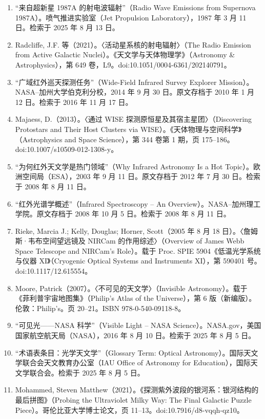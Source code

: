\begin{enumerate}
  \item “来自超新星 1987A 的射电波辐射”（Radio Wave Emissions from Supernova 1987A）。喷气推进实验室（Jet Propulsion Laboratory），1987 年 3 月 11 日。检索于 2025 年 8 月 13 日。
  \item Radcliffe, J.F. 等（2021）。〈活动星系核的射电辐射〉（The Radio Emission from Active Galactic Nuclei）。《天文学与天体物理学》（Astronomy \& Astrophysics），第 649 卷，L9。doi:10.1051/0004-6361/202140791。
  \item “广域红外巡天探测任务”（Wide-Field Infrared Survey Explorer Mission）。NASA–加州大学伯克利分校，2014 年 9 月 30 日。原文存档于 2010 年 1 月 12 日。检索于 2016 年 11 月 17 日。
  \item Majaess, D.（2013）。〈通过 WISE 探测原恒星及其宿主星团〉（Discovering Protostars and Their Host Clusters via WISE）。《天体物理与空间科学》（Astrophysics and Space Science），第 344 卷第 1 期，页 175–186。doi:10.1007/s10509-012-1308-y。
  \item “为何红外天文学是热门领域”（Why Infrared Astronomy Is a Hot Topic）。欧洲空间局（ESA），2003 年 9 月 11 日。原文存档于 2012 年 7 月 30 日。检索于 2008 年 8 月 11 日。
  \item “红外光谱学概述”（Infrared Spectroscopy – An Overview）。NASA–加州理工学院。原文存档于 2008 年 10 月 5 日。检索于 2008 年 8 月 11 日。
  \item Rieke, Marcia J.; Kelly, Douglas; Horner, Scott（2005 年 8 月 18 日）。〈詹姆斯·韦布空间望远镜及 NIRCam 的作用综述〉（Overview of James Webb Space Telescope and NIRCam’s Role）。载于 Proc. SPIE 5904《低温光学系统与仪器 XI》（Cryogenic Optical Systems and Instruments XI），第 590401 号。doi:10.1117/12.615554。
  \item Moore, Patrick（2007）。〈不可见的天文学〉（Invisible Astronomy）。载于《菲利普宇宙地图集》（Philip’s Atlas of the Universe），第 6 版（新编版）。伦敦：Philip’s。页 20–21。ISBN 978-0-540-09118-8。
  \item “可见光——NASA 科学”（Visible Light – NASA Science）。NASA.gov，美国国家航空航天局（NASA），2016 年 8 月 10 日。检索于 2025 年 8 月 5 日。
  \item “术语表条目：光学天文学”（Glossary Term: Optical Astronomy）。国际天文学联合会天文教育办公室（IAU Office of Astronomy for Education），国际天文学联合会。检索于 2025 年 8 月 5 日。
  \item Mohammed, Steven Matthew（2021）。《探测紫外波段的银河系：银河结构的最后拼图》（Probing the Ultraviolet Milky Way: The Final Galactic Puzzle Piece）。哥伦比亚大学博士论文，页 11–13。doi:10.7916/d8-vqqh-qz10。

\end{enumerate}
